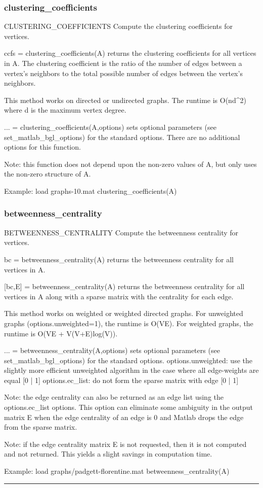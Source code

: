 \subsubsection*{clustering\_coefficients}
\begin{mcode}
  CLUSTERING_COEFFICIENTS Compute the clustering coefficients for vertices.
 
  ccfs = clustering_coefficients(A) returns the clustering coefficients for
  all vertices in A.  The clustering coefficient is the ratio of the number
  of edges between a vertex's neighbors to the total possible number of 
  edges between the vertex's neighbors. 
 
  This method works on directed or undirected graphs.
  The runtime is O(nd^2) where d is the maximum vertex degree.
 
  ... = clustering_coefficients(A,options) sets optional parameters (see 
  set_matlab_bgl_options) for the standard options.
    There are no additional options for this function.
 
  Note: this function does not depend upon the non-zero values of A, but
  only uses the non-zero structure of A.
 
  Example:
     load graphs\clique-10.mat
     clustering_coefficients(A)
\end{mcode}
\newpage
\subsubsection*{betweenness\_centrality}
\begin{mcode}
  BETWEENNESS_CENTRALITY Compute the betweenness centrality for vertices.
 
  bc = betweenness_centrality(A) returns the betweenness centrality for
  all vertices in A.  
 
  [bc,E] = betweenness_centrality(A) returns the betweenness centrality for
  all vertices in A along with a sparse matrix with the centrality for each
  edge.  
 
  This method works on weighted or weighted directed graphs.
  For unweighted graphs (options.unweighted=1), the runtime is O(VE).
  For weighted graphs, the runtime is O(VE + V(V+E)log(V)).
 
  ... = betweenness_centrality(A,options) sets optional parameters (see 
  set_matlab_bgl_options) for the standard options.
    options.unweighted: use the slightly more efficient unweighted
      algorithm in the case where all edge-weights are equal [{0} | 1]  
    options.ec_list: do not form the sparse matrix with edge [{0} | 1]
 
  Note: the edge centrality can also be returned as an edge list using the
  options.ec_list options.  This option can eliminate some ambiguity in the
  output matrix E when the edge centrality of an edge is 0 and Matlab drops
  the edge from the sparse matrix.  
 
  Note: if the edge centrality matrix E is not requested, then it is not
  computed and not returned.  This yields a slight savings in computation
  time.  
 
  Example:
     load graphs/padgett-florentine.mat
     betweenness_centrality(A)
\end{mcode}
\newpage
\hrule
